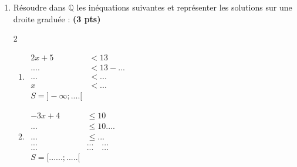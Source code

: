 \documentclass[12pt,a4paper]{article}
\begin{document}
\begin{enumerate}
    \item Résoudre dans $\mathbb{Q}$ les inéquations suivantes et représenter les solutions sur une droite graduée : \textbf{(3 pts)}
\begin{multicols}{2}
\setlength{\columnseprule}{0.1mm}
\begin{enumerate}
\item[]
\(
\begin{aligned}
2x + 5 &< 13\\[0.5cm]
.... &< 13 - ...\\[0.5cm]
... &< ...\\[0.5cm]
x &< ...\\[0.5cm]
\boxed{S=]-\infty;....[}
\end{aligned}
\)
\item[]
\(
\begin{aligned}
-3x + 4 &\leq 10\\[0.5cm]
... &\leq 10....\\[0.5cm]
... &\leq ...\\[0.5cm]
...\quad &...\quad... \\[0.5cm]
...\quad &...\quad...\\[0.5cm]
\boxed{S=[......;.....[}
\end{aligned}
\)

\end{enumerate}
\end{multicols}  
\end{enumerate}
\end{document}
